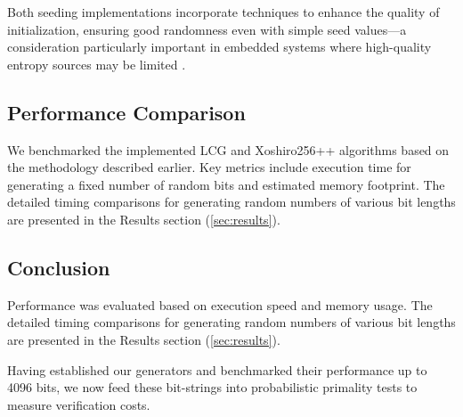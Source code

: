 Both seeding implementations incorporate techniques to enhance the quality of initialization, ensuring good randomness even with simple seed values—a consideration particularly important in embedded systems where high-quality entropy sources may be limited \cite{embedded_prng}.

\subsection{Performance Comparison}
We benchmarked the implemented LCG and Xoshiro256++ algorithms based on the methodology described earlier. Key metrics include execution time for generating a fixed number of random bits and estimated memory footprint. The detailed timing comparisons for generating random numbers of various bit lengths are presented in the Results section (\autoref{sec:results}).

\subsection{Conclusion}
Performance was evaluated based on execution speed and memory usage. The detailed timing comparisons for generating random numbers of various bit lengths are presented in the Results section (\autoref{sec:results}). 

Having established our generators and benchmarked their performance up to 4096 bits, we now feed these bit-strings into probabilistic primality tests to measure verification costs.